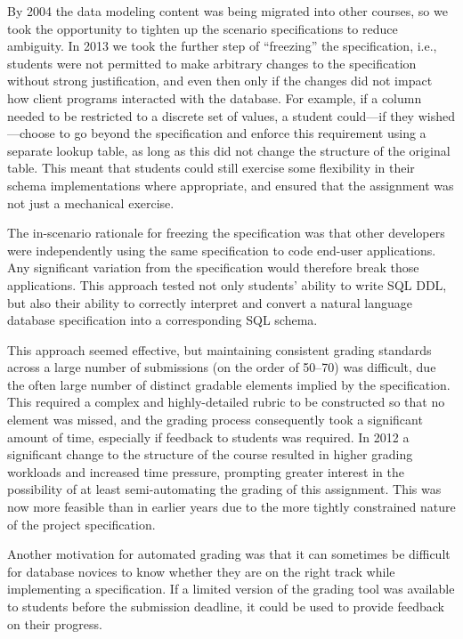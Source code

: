 \documentclass[sigconf, authordraft, capitalise]{acmart}
\begin{document}
By 2004 the data modeling content was being migrated into other courses, so we took the opportunity to tighten up the scenario specifications to reduce ambiguity. In 2013 we took the further step of ``freezing'' the specification, i.e., students were not permitted to make arbitrary changes to the specification without strong justification, and even then only if the changes did not impact how client programs interacted with the database. For example, if a column needed to be restricted to a discrete set of values, a student could---if they wished---choose to go beyond the specification and enforce this requirement using a separate lookup table, as long as this did not change the structure of the original table. This meant that students could still exercise some flexibility in their schema implementations where appropriate, and ensured that the assignment was not just a mechanical exercise.

The in-scenario rationale for freezing the specification was that other developers were independently using the same specification to code end-user applications. Any significant variation from the specification would therefore break those applications. This approach tested not only students' ability to write SQL DDL, but also their ability to correctly interpret and convert a natural language database specification into a corresponding SQL schema.

This approach seemed effective, but maintaining consistent grading standards across a large number of submissions (on the order of 50--70) was difficult, due the often large number of distinct gradable elements implied by the specification. This required a complex and highly-detailed rubric to be constructed so that no element was missed, and the grading process consequently took a significant amount of time, especially if feedback to students was required. In 2012 a significant change to the structure of the course resulted in higher grading workloads and increased time pressure, prompting greater interest in the possibility of at least semi-automating the grading of this assignment. This was now more feasible than in earlier years due to the more tightly constrained nature of the project specification.

Another motivation for automated grading was that it can sometimes be difficult for database novices to know whether they are on the right track while implementing a specification. If a limited version of the grading tool was available to students before the submission deadline, it could be used to provide feedback on their progress.
\end{document}
